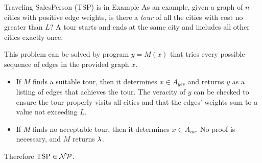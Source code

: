\begin{frame}{Traveling SalesPerson (TSP) is in }{Example}
As an example, given a graph of $n$ cities with positive edge weights, is there a \emph{tour} of all the cities with cost no greater than $L$?  A tour starts and ends at the same city and includes all other cities exactly once.

This problem can be solved by program $y=M(x)$ that tries every possible sequence of edges in the provided graph $x$.
\begin{itemize}
    \item If $M$ finds a suitable tour, then it determines $x\in A_{yes}$ and returns $y$ as a listing of edges that achieves the tour.  The veracity of $y$ can be checked to ensure the tour properly visits all cities and that the edges' weights sum to a value not exceeding $L$.
    \item If $M$ finds no acceptable tour, then it determines $x \in A_{no}$.  No proof is necessary, and $M$ returns $\lambda{}$.
\end{itemize}
Therefore $\mbox{TSP}\in \mathcal{NP}$.
    
\end{frame}